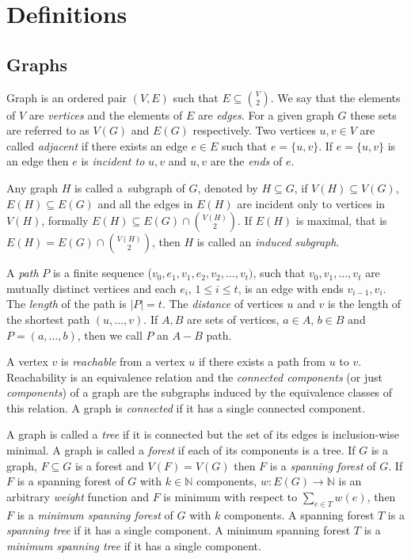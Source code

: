 
\chapter{Definitions}

\section{Graphs}
Graph is an ordered pair $(V,E)$ such that $E \subseteq {V \choose 2}$. We say that the elements of $V$ are \textit{vertices} and the elements of $E$ are \textit{edges}. For a given graph $G$ these sets are referred to as $V(G)$ and $E(G)$ respectively. Two vertices $u,v \in V$ are called \textit{adjacent} if there exists an edge $e \in E$ such that $e = \{u,v\}$. If $e = \{u, v\}$ is an edge then $e$ is \textit{incident to} $u,v$ and $u,v$ are the \textit{ends} of $e$.

Any graph $H$ is called a~subgraph of $G$, denoted by $H \subseteq G$, if \linebreak ${V(H) \subseteq V(G)}$, $E(H) \subseteq E(G)$ and all the edges in $E(H)$ are incident only to vertices in $V(H)$, formally $E(H) \subseteq E(G) \cap {V(H) \choose 2}$. If $E(H)$ is maximal, that is ${E(H) = E(G) \cap { V(H) \choose 2 }}$, then $H$ is called an \textit{induced subgraph}.

A \textit{path} $P$ is a finite sequence ($v_0,e_1,v_1,e_2,v_2,\ldots,v_t)$, such that $v_0, v_1,\ldots,v_t$ are mutually distinct vertices and each $e_i$, $1 \leq i \leq t$, is an edge with ends $v_{i-1}, v_i$. The \textit{length} of the path is $\lvert P \rvert = t$. The \textit{distance} of vertices $u$ and $v$ is the length of the shortest path $(u,\ldots,v)$. If $A,B$ are sets of vertices, $a \in A$, $b \in B$ and $P = (a,\ldots,b)$, then we call $P$ an $A{-}B$ path.

A vertex $v$ is \textit{reachable} from a vertex $u$ if there exists a path from $u$ to $v$. Reachability is an equivalence relation and the \textit{connected components} (or just \textit{components}) of a graph are the subgraphs induced by the equivalence classes of this relation. A graph is \textit{connected} if it has a single connected component.

A graph is called a \textit{tree} if it is connected but the set of its edges is inclusion-wise minimal. A graph is called a \textit{forest} if each of its components is a tree. If $G$ is a graph, $F \subseteq G$ is a forest and $V(F) = V(G)$ then $F$ is a \textit{spanning forest} of $G$. If $F$ is a spanning forest of $G$ with $k \in \mathbb{N}$ components, $w : E(G) \rightarrow \mathbb{N}$ is an arbitrary \textit{weight} function and $F$ is minimum with respect to $\sum_{e \in T} w(e)$, then $F$ is a \textit{minimum spanning forest} of $G$ with $k$ components. A spanning forest $T$ is a \textit{spanning tree} if it has a single component. A minimum spanning forest $T$ is a \textit{minimum spanning tree} if it has a single component.


